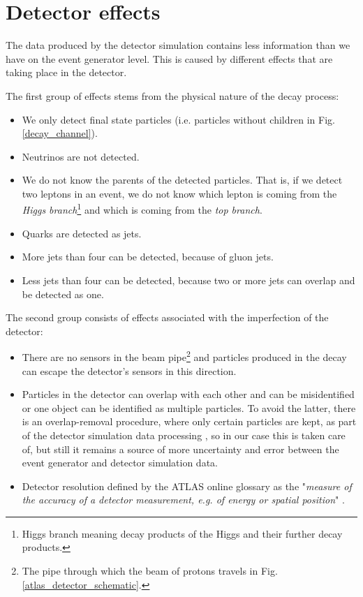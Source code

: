\documentclass{ctuthesis}
\begin{document}
\section{Detector effects}
\label{detector_effects}
The data produced by the detector simulation contains less information than we have on the event generator level. This is caused by different effects that are taking place in the detector.

The first group of effects stems from the physical nature of the decay process:
\begin{itemize}
    \item We only detect final state particles (i.e. particles without children in Fig. \ref{decay_channel}).
    \item Neutrinos are not detected.
    \item We do not know the parents of the detected particles. That is, if we detect two leptons in an event, we do not know which lepton is coming from the \emph{Higgs branch}\footnote{Higgs branch meaning decay products of the Higgs and their further decay products.} and which is coming from the \emph{top branch}.
    \item Quarks are detected as jets.
    \item More jets than four can be detected, because of gluon jets.
    \item Less jets than four can be detected, because two or more jets can overlap and be detected as one.
\end{itemize}
The second group consists of effects associated with the imperfection of the detector:
\begin{itemize}
    \item There are no sensors in the beam pipe\footnote{The pipe through which the beam of protons travels in Fig. \ref{atlas_detector_schematic}.} and particles produced in the decay can escape the detector's sensors in this direction.
    \item Particles in the detector can overlap with each other and can be misidentified or one object can be identified as multiple particles. To avoid the latter, there is an overlap-removal procedure, where only certain particles are kept, as part of the detector simulation data processing \cite{overlap_removal}, so in our case this is taken care of, but still it remains a source of more uncertainty and error between the event generator and detector simulation data. 
    \item Detector resolution defined by the ATLAS online glossary as the "\emph{measure of the accuracy of a detector measurement, e.g. of energy or spatial position}" \cite{detector_resolution}.
\end{itemize}
\end{document}
